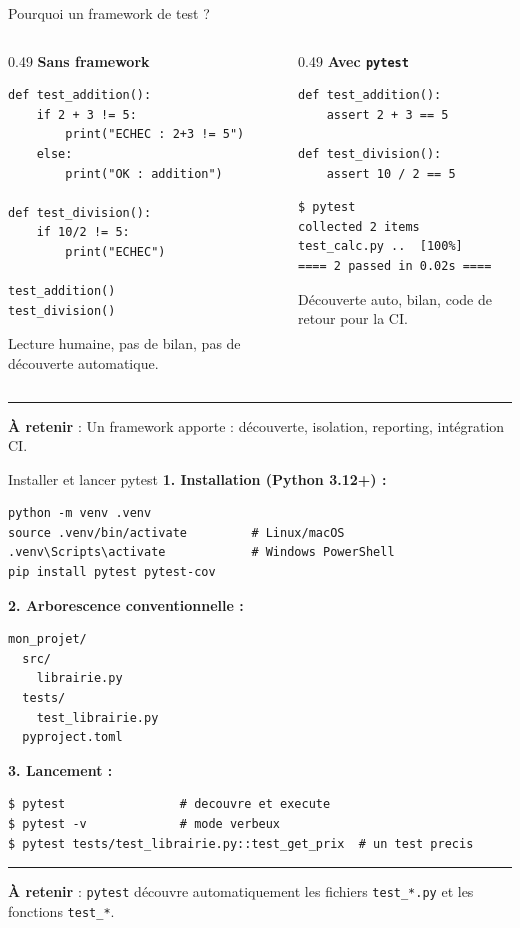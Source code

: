 \documentclass[aspectratio=169,11pt]{beamer}
\newcommand{\takeaway}[1]{%
\vfill\begin{beamercolorbox}[wd=\linewidth,sep=0.4em]{}
\color{accent2}\rule[0.6ex]{1.2em}{1.2pt}\hspace{0.4em}%
\textbf{\color{accent2}\small À retenir} \textcolor{textsoft}{:} %
{\small\color{textmain}#1}
\end{beamercolorbox}}
\begin{document}
\begin{frame}[fragile,t,shrink=10]{Pourquoi un framework de test ?}
\begin{columns}[T,onlytextwidth]
\begin{column}{0.49\textwidth}
\textbf{\color{bad}Sans framework}
\begin{lstlisting}[style=pythondark]
def test_addition():
    if 2 + 3 != 5:
        print("ECHEC : 2+3 != 5")
    else:
        print("OK : addition")

def test_division():
    if 10/2 != 5:
        print("ECHEC")

test_addition()
test_division()
\end{lstlisting}
\scriptsize\color{textsoft} Lecture humaine, pas de bilan, pas de découverte automatique.
\end{column}
\begin{column}{0.49\textwidth}
\textbf{\color{good}Avec \texttt{pytest}}
\begin{lstlisting}[style=pythondark]
def test_addition():
    assert 2 + 3 == 5

def test_division():
    assert 10 / 2 == 5
\end{lstlisting}
\begin{lstlisting}[style=bashdark]
$ pytest
collected 2 items
test_calc.py ..  [100%]
==== 2 passed in 0.02s ====
\end{lstlisting}
\scriptsize\color{textsoft} Découverte auto, bilan, code de retour pour la CI.
\end{column}
\end{columns}
\takeaway{Un framework apporte : découverte, isolation, reporting, intégration CI.}
\end{frame}

\begin{frame}[fragile,t,shrink=20]{Installer et lancer pytest}
\footnotesize
\textbf{1. Installation (Python 3.12+) :}
\begin{lstlisting}[style=bashdark]
python -m venv .venv
source .venv/bin/activate         # Linux/macOS
.venv\Scripts\activate            # Windows PowerShell
pip install pytest pytest-cov
\end{lstlisting}
\vspace{0.2cm}
\textbf{2. Arborescence conventionnelle :}
\begin{lstlisting}[style=bashdark]
mon_projet/
  src/
    librairie.py
  tests/
    test_librairie.py
  pyproject.toml
\end{lstlisting}
\vspace{0.2cm}
\textbf{3. Lancement :}
\begin{lstlisting}[style=bashdark]
$ pytest                # decouvre et execute
$ pytest -v             # mode verbeux
$ pytest tests/test_librairie.py::test_get_prix  # un test precis
\end{lstlisting}
\takeaway{\texttt{pytest} découvre automatiquement les fichiers \texttt{test\_*.py} et les fonctions \texttt{test\_*}.}
\end{frame}
\end{document}
